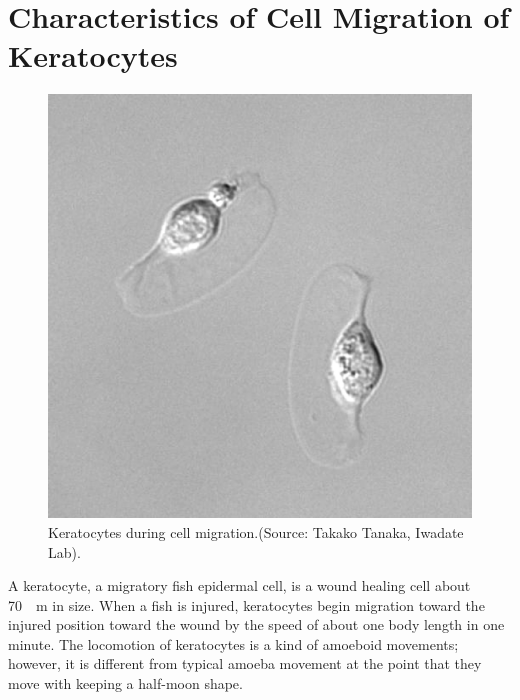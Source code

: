 \documentclass[a4paper,12pt, oneside]{book}
\begin{document}
\section{Characteristics of Cell Migration of Keratocytes}
\begin{figure}[tbp]
\centering
\includegraphics[scale=0.4]{kera.eps}
\caption{Keratocytes during cell migration.(Source: Takako Tanaka, Iwadate Lab).}
\label{fig:kera}
\end{figure}

A keratocyte, a migratory fish epidermal cell, is a wound healing cell about \SI{70}{\mu m}  in size.
When a fish is injured, keratocytes begin migration toward the injured position toward  the wound by the speed of about one body length in one minute.
The locomotion of keratocytes is a kind of amoeboid movements;
however, it is different from typical amoeba movement at the point that they move with keeping a half-moon shape. 
\end{document}
